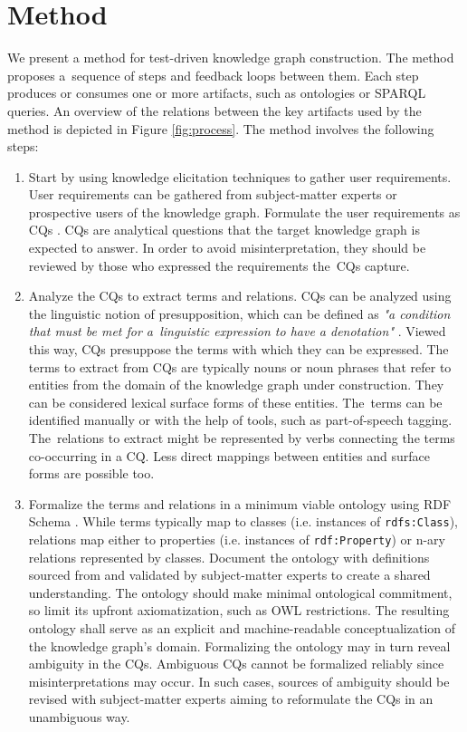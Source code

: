 \documentclass[
]{ceurart}
\begin{document}
\section{Method}


We present a method for test-driven knowledge graph construction. The method proposes a~sequence of steps and feedback loops between them. Each step produces or consumes one or more artifacts, such as ontologies or SPARQL queries. An overview of the relations between the key artifacts used by the method is depicted in Figure \ref{fig:process}. The method involves the following steps:
\begin{enumerate}
    \item Start by using knowledge elicitation techniques \cite{Shadbolt2015} to gather user requirements. User requirements can be gathered from subject-matter experts or prospective users of the knowledge graph. Formulate the user requirements as CQs \cite{Gruninger1994}. CQs are analytical questions that the target knowledge graph is expected to answer. In order to avoid misinterpretation, they should be reviewed by those who expressed the requirements the~CQs capture.
    \item Analyze the CQs to extract terms and relations. CQs can be analyzed using the linguistic notion of presupposition, which can be defined as \textit{"a condition that must be met for a~linguistic expression to have a denotation"} \cite{Ren2014}. Viewed this way, CQs presuppose the terms with which they can be expressed. The terms to extract from CQs are typically nouns or noun phrases that refer to entities from the domain of the knowledge graph under construction. They can be considered lexical surface forms of these entities. The~terms can be identified manually or with the help of tools, such as part-of-speech tagging. The~relations to extract might be represented by verbs connecting the terms co-occurring in a CQ. Less direct mappings between entities and surface forms are possible too.
    \item Formalize the terms and relations in a minimum viable ontology using RDF Schema \cite{Brickley2014}. While terms typically map to classes (i.e. instances of \texttt{rdfs:Class}), relations map either to properties (i.e. instances of \texttt{rdf:Property}) or n-ary relations represented by classes. Document the ontology with definitions sourced from and validated by subject-matter experts to create a shared understanding. The ontology should make minimal ontological commitment, so limit its upfront axiomatization, such as OWL restrictions. The resulting ontology shall serve as an explicit and machine-readable conceptualization of the knowledge graph's domain. Formalizing the ontology may in turn reveal ambiguity in the CQs. Ambiguous CQs cannot be formalized reliably since misinterpretations may occur. In such cases, sources of ambiguity should be revised with subject-matter experts aiming to reformulate the CQs in an unambiguous way.

\end{enumerate}
\end{document}
